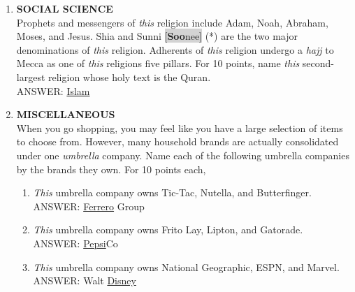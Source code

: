 \documentclass{report}
\newcommand*{\backtrack}{\setcounter{enumi}{\numexpr\theenumi-1\relax}}
\begin{document}
\begin{enumerate}
    \item \textbf{SOCIAL SCIENCE} \\ Prophets and messengers of \textit{this} religion include Adam, Noah, Abraham, Moses, and Jesus. Shia and Sunni \colorbox{lightGray}{[\textbf{Soo}\textperiodcentered nee]} (*) are the two major denominations of \textit{this} religion. Adherents of \textit{this} religion undergo a \textit{hajj} to Mecca as one of \textit{this} religions five pillars. For 10 points, name \textit{this} second-largest religion whose holy text is the Quran. \\ ANSWER: \underline{Islam} \backtrack
    \item \textbf{MISCELLANEOUS} \\ When you go shopping, you may feel like you have a large selection of items to choose from. However, many household brands are actually consolidated under one \textit{umbrella} company. Name each of the following umbrella companies by the brands they own. For 10 points each,
    \begin{enumerate}[label=\Alph*]
        \item \textit{This} umbrella company owns Tic-Tac, Nutella, and Butterfinger. \\ ANSWER: \underline{Ferrero} Group
        \item \textit{This} umbrella company owns Frito Lay, Lipton, and Gatorade. \\ ANSWER: \underline{Pepsi}Co
        \item \textit{This} umbrella company owns National Geographic, ESPN, and Marvel. \\ ANSWER: Walt \underline{Disney}
    \end{enumerate}


\end{enumerate}
\end{document}
